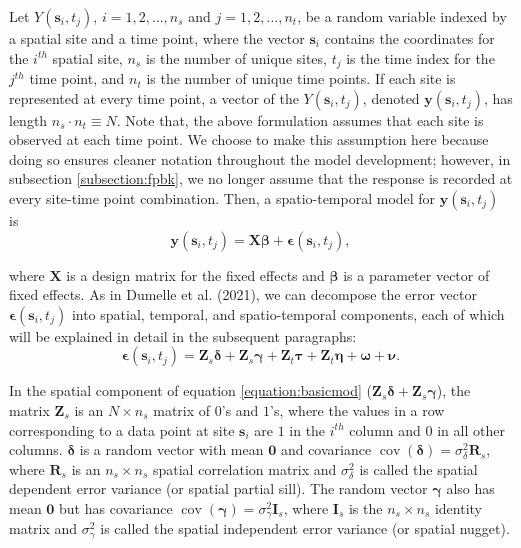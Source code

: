 \documentclass[]{article}    %
\begin{document}
Let \(Y(\mathbf{s}_{i}, t_j)\), \(i = 1, 2, \ldots, n_{s}\) and
\(j = 1, 2, \ldots, n_{t}\), be a random variable indexed by a spatial
site and a time point, where the vector \(\mathbf{s}_i\) contains the
coordinates for the \(i^{th}\) spatial site, \(n_s\) is the number of
unique sites, \(t_j\) is the time index for the \(j^{th}\) time point,
and \(n_t\) is the number of unique time points. If each site is
represented at every time point, a vector of the
\(Y(\mathbf{s}_{i}, t_j)\), denoted \(\mathbf{y}(\mathbf{s}_{i}, t_j)\),
has length \(n_{s} \cdot n_{t} \equiv N\). Note that, the above
formulation assumes that each site is observed at each time point. We
choose to make this assumption here because doing so ensures cleaner
notation throughout the model development; however, in subsection
\ref{subsection:fpbk}, we no longer assume that the response is recorded
at every site-time point combination. Then, a spatio-temporal model for
\(\mathbf{y}(\mathbf{s}_{i}, t_j)\) is \mbox{} \begin{equation}
\mathbf{y}(\mathbf{s}_{i}, t_j) = \mathbf{X} \bm{\beta} + \bm{\epsilon}(\mathbf{s}_{i}, t_j),
\end{equation}

\noindent where \(\mathbf{X}\) is a design matrix for the fixed effects
and \(\bm{\beta}\) is a parameter vector of fixed effects. As in Dumelle
et al. (2021), we can decompose the error vector
\(\bm{\epsilon}(\mathbf{s}_{i}, t_j)\) into spatial, temporal, and
spatio-temporal components, each of which will be explained in detail in
the subsequent paragraphs: \mbox{}
\begin{equation} \label{equation:basicmod}
\bm{\epsilon}(\mathbf{s}_{i}, t_j) = \mathbf{Z}_{s} \bm{\delta} + \mathbf{Z}_{s} \bm{\gamma} + \mathbf{Z}_t \bm{\tau} + \mathbf{Z}_t \bm{\eta} + \bm{\omega} + \bm{\nu}.
\end{equation}

In the spatial component of equation \ref{equation:basicmod}
(\(\mathbf{Z}_{s} \bm{\delta} + \mathbf{Z}_{s} \bm{\gamma}\)), the
matrix \(\mathbf{Z}_{s}\) is an \(N \times n_s\) matrix of \(0\)'s and
\(1\)'s, where the values in a row corresponding to a data point at site
\(\mathbf{s}_{i}\) are \(1\) in the \(i^{th}\) column and \(0\) in all
other columns. \(\bm{\delta}\) is a random vector with mean
\(\mathbf{0}\) and covariance
\(\mathop{\mathrm{{cov}}}(\bm{\delta}) = \sigma^2_{\delta} \mathbf{R}_{s}\),
where \(\mathbf{R}_s\) is an \(n_s \times n_s\) spatial correlation
matrix and \(\sigma^2_{\delta}\) is called the spatial dependent error
variance (or spatial partial sill). The random vector \(\bm{\gamma}\)
also has mean \(\mathbf{0}\) but has covariance
\(\mathop{\mathrm{{cov}}}(\bm{\gamma}) = \sigma^2_{\gamma} \mathbf{I}_{s}\),
where \(\mathbf{I}_s\) is the \(n_s \times n_s\) identity matrix and
\(\sigma^2_{\gamma}\) is called the spatial independent error variance
(or spatial nugget).
\end{document}
